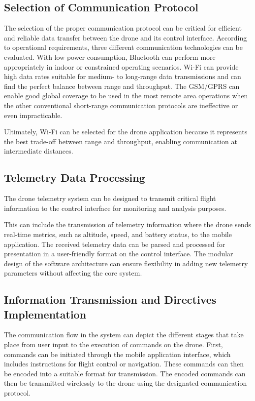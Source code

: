 \subsection{Selection of Communication Protocol}

The selection of the proper communication protocol can be critical for efficient and reliable data transfer between the drone and its control interface. According to operational requirements, three different communication technologies can be evaluated. With low power consumption, Bluetooth can perform more appropriately in indoor or constrained operating scenarios. Wi-Fi can provide high data rates suitable for medium- to long-range data transmissions and can find the perfect balance between range and throughput. The GSM/GPRS can enable good global coverage to be used in the most remote area operations when the other conventional short-range communication protocols are ineffective or even impracticable.

Ultimately, Wi-Fi can be selected for the drone application because it represents the best trade-off between range and throughput, enabling communication at intermediate distances.

\subsection{Telemetry Data Processing}

The drone telemetry system can be designed to transmit critical flight information to the control interface for monitoring and analysis purposes.

This can include the transmission of telemetry information where the drone sends real-time metrics, such as altitude, speed, and battery status, to the mobile application. The received telemetry data can be parsed and processed for presentation in a user-friendly format on the control interface. The modular design of the software architecture can ensure flexibility in adding new telemetry parameters without affecting the core system.

\subsection{Information Transmission and Directives Implementation}
The communication flow in the system can depict the different stages that take place from user input to the execution of commands on the drone. First, commands can be initiated through the mobile application interface, which includes instructions for flight control or navigation. These commands can then be encoded into a suitable format for transmission. The encoded commands can then be transmitted wirelessly to the drone using the designated communication protocol.


